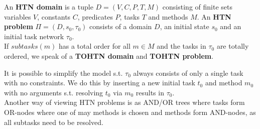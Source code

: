 \begin{definition} %
	An \textbf{HTN domain} is a tuple $D = (V, C, P, T, M)$ consisting of finite sets variables $V$, constants $C$, predicates $P$, tasks $T$ and methods $M$. An \textbf{HTN problem} $\Pi = (D, s_0, \tau_0)$ consists of a domain $D$, an initial state $s_0$ and an initial task network $\tau_0$. \\
	If $subtasks(m)$ has a total order for all $m \in M$ and the tasks in $\tau_0$ are totally ordered, we speak of a \textbf{TOHTN domain} and \textbf{TOHTN problem}.
\end{definition}
It is possible to simplify the model s.t. $\tau_0$ always consists of only a single task with no constraints. We do this by inserting a new initial task $t_0$ and method $m_0$ with no arguments s.t. resolving $t_0$ via $m_0$ results in $\tau_0$. \\
Another way of viewing HTN problems is as AND/OR trees \cite{holler2021landmark} where tasks form OR-nodes where one of may methods is chosen and methods form AND-nodes, as all subtasks need to be resolved.

